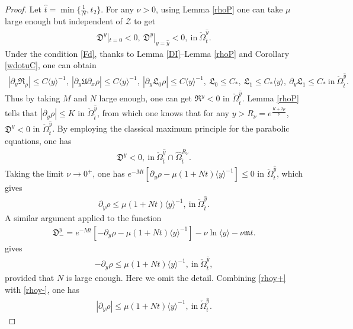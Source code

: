 \documentclass{amsart}
\numberwithin{equation}{section}
\newcommand\y{{{\langle y \rangle}}}
\begin{document}
\begin{proof}
Let $\hat{t}=\min\{\frac{1}{N},t_{2}\}$. For any $\nu>0$, using Lemma \ref{rhoP} one can take $\mu$ large enough but independent of $\mathcal{Z}$ to get
\begin{align*}
\mathfrak{D}^{y}|_{t=0}<0,~
\mathfrak{D}^{y}|_{y=\hat{y}}<0,~\text{in}~\check{\Omega}_{\hat{t}}^{\hat{y}}.
\end{align*}
Under the condition \eqref{Fd}, thanks to Lemma \ref{DI}--Lemma \ref{rhoP} and Corollary \eqref{wdotuC}, one can obtain
\begin{align*}
|\partial_{y}\mathfrak{R}_{\rho}|\leq C\y^{-1},~
|\partial_{y}\mathfrak{U}\partial_{x}\rho|\leq C\y^{-1},~
|\partial_{y}\mathfrak{L}_{0}\rho|\leq C\y^{-1},~
\mathfrak{L}_{0}\leq C_{*},~
\mathfrak{L}_{1}\leq C_{*}\y,~
\partial_{y}\mathfrak{L}_{1}\leq C_{*}~\text{in}~\check{\Omega}_{\hat{t}}^{\hat{y}}.
\end{align*}
Thus by taking $M$ and $N$ large enough, one can get $\mathfrak{R}^{y}<0$ in $\check{\Omega}_{\hat{t}}^{\hat{y}}$.
Lemma \ref{rhoP} tells that $|\partial_{y}\rho|\leq K$ in $\check{\Omega}_{\hat{t}}^{\hat{y}}$, from which one knows that for any $y>R_{\nu}=e^{\frac{K+2\mu}{\nu}}$, $\mathfrak{D}^{y}<0$ in $\check{\Omega}_{\hat{t}}^{\hat{y}}$.
By employing the classical maximum principle for the parabolic equations, one has
\begin{align*}
\mathfrak{D}^{y}<0,~\text{in}~\check{\Omega}_{\hat{t}}^{\hat{y}}\cap\hat{\Omega}_{\hat{t}}^{R_{\nu}}.
\end{align*}
Taking the limit $\nu\to 0^{+}$, one has $e^{-Mt}[\partial_{y}\rho-\mu(1+Nt)\y^{-1}]\leq0$ in $\check{\Omega}_{\hat{t}}^{\hat{y}}$, which gives
\begin{align}\label{rhoy+}
\partial_{y}\rho\leq\mu(1+Nt)\y^{-1}, ~\text{in}~\check{\Omega}_{\hat{t}}^{\hat{y}}.
\end{align}
A similar argument applied to the function
\begin{align*}
\mathfrak{D}^{y}_{-}=e^{-Mt}[-\partial_{y}\rho-\mu(1+Nt)\y^{-1}]-\nu\ln\y-\nu \mathfrak{m}t.
\end{align*}
gives
\begin{align}\label{rhoy-}
-\partial_{y}\rho\leq\mu(1+Nt)\y^{-1}, ~\text{in}~\check{\Omega}_{\hat{t}}^{\hat{y}},
\end{align}
provided that $N$ is large enough. Here we omit the detail. Combining \eqref{rhoy+} with \eqref{rhoy-}, one has
\begin{align}\label{rhoy}
|\partial_{y}\rho|\leq\mu(1+Nt)\y^{-1}, ~\text{in}~\check{\Omega}_{\hat{t}}^{\hat{y}}.
\end{align}


\end{proof}
\end{document}
